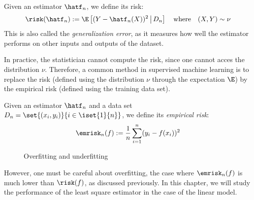 \documentclass[toc]{../cs-classes/cs-classes}
\begin{document}
\begin{definition}
    Given an estimator $\hatf_n$, we define its risk:
    \begin{equation}
        \label{eq:sq-risk}
        \risk(\hatf_n) := \E\left[(Y-\hatf_n(X))^2\,\big| \, D_n\right] \quad \textnormal{where} \quad (X, Y)\sim\nu
    \end{equation}
    This is also called the \emph{generalization error}, as it measures how well the estimator performs on other inputs and outputs of the dataset.
\end{definition}

In practice, the statistician cannot compute the risk, since one cannot acces the distribution $\nu$. Therefore, a common method in supervised machine learning is to replace the risk (defined using the distribution $\nu$ through the expectation $\E$) by the empirical risk (defined using the training data set).

\begin{definition}
    \label{eq:sq-empirical-risk}
    Given an estimator $\hatf_n$ and a data set $D_n=\set{(x_i, y_i)}{i\in\iset{1}{n}}$, we define its \emph{empirical risk}:
    \begin{equation}
        \emrisk_n(f) := \frac{1}{n}\sum_{i=1}^n (y_i-f(x_i))^2
    \end{equation}
\end{definition}

\begin{figure}
    \centering
    \captionsetup{justification=centering}
    \caption{Overfitting and underfitting}
\end{figure}
However, one must be careful about overfitting, the case where $\emrisk_n(f)$ is much lower than $\risk(f)$, as discussed previously. In this chapter, we will study the performance of the least square estimator in the case of the linear model.
\end{document}
